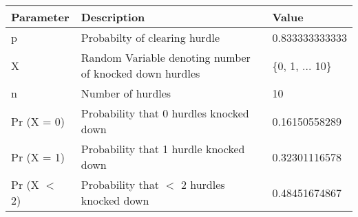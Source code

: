 \begin{tabular}{|l|l|l|}\hline
Parameter	&Description	&Value\\ \hline
p	&Probabilty of clearing hurdle	&0.833333333333\\ \hline
X	&Random Variable denoting number of knocked down hurdles	&\{0, 1, ... 10\}\\ \hline
n	&Number of hurdles	&10\\ \hline
Pr (X = 0)	&Probability that 0 hurdles knocked down	&0.16150558289\\ \hline
Pr (X = 1)	&Probability that 1 hurdle knocked down	&0.32301116578\\ \hline
Pr (X $<$  2)	&Probability that $<$ 2 hurdles knocked down	&0.48451674867\\ \hline
\end{tabular}
